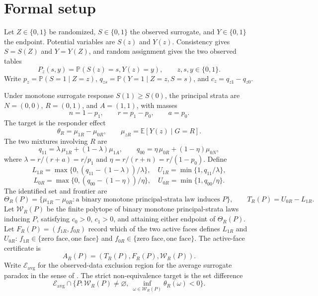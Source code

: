 \documentclass[11pt]{article}
\newcommand{\E}{\mathbb{E}}
\renewcommand{\Pr}{\mathbb{P}}
\theoremstyle{definition}
\theoremstyle{plain}
\theoremstyle{remark}
\begin{document}
\section{Formal setup}
Let \(Z\in\{0,1\}\) be randomized, \(S\in\{0,1\}\) the observed surrogate, and \(Y\in\{0,1\}\) the endpoint. Potential variables are \(S(z)\) and \(Y(z)\). Consistency gives \(S=S(Z)\) and \(Y=Y(Z)\), and random assignment gives the two observed tables
\[
  P_z(s,y)=\Pr(S(z)=s,Y(z)=y),\qquad z,s,y\in\{0,1\}.
\]
Write \(p_z=\Pr(S=1\mid Z=z)\), \(q_{zs}=\Pr(Y=1\mid Z=z,S=s)\), and \(c_z=q_{z1}-q_{z0}\).

Under monotone surrogate response \(S(1)\ge S(0)\), the principal strata are \(N=(0,0)\), \(R=(0,1)\), and \(A=(1,1)\), with masses
\[
  n=1-p_1,\qquad r=p_1-p_0,\qquad a=p_0 .
\]
The target is the responder effect
\[
  \theta_R=\mu_{1R}-\mu_{0R},\qquad
  \mu_{zR}=\E[Y(z)\mid G=R].
\]
The two mixtures involving \(R\) are
\[
  q_{11}=\lambda\,\mu_{1R}+(1-\lambda)\mu_{1A},
  \qquad
  q_{00}=\eta\,\mu_{0R}+(1-\eta)\mu_{0N},
\]
where \(\lambda=r/(r+a)=r/p_1\) and \(\eta=r/(r+n)=r/(1-p_0)\). Define
\[
  L_{1R}=\max\{0,(q_{11}-(1-\lambda))/\lambda\},\quad
  U_{1R}=\min\{1,q_{11}/\lambda\},
\]
\[
  L_{0R}=\max\{0,(q_{00}-(1-\eta))/\eta\},\quad
  U_{0R}=\min\{1,q_{00}/\eta\}.
\]
The identified set and frontier are
\[
  \Theta_R(P)=\{\mu_{1R}-\mu_{0R}: \text{a binary monotone principal-strata law induces }P\},
  \qquad
  T_R(P)=U_{0R}-L_{1R}.
\]
Let \(\mathcal W_R(P)\) be the finite polytope of binary monotone principal-strata laws inducing \(P\), satisfying \(c_0>0\), \(c_1>0\), and attaining either endpoint of \(\Theta_R(P)\). Let \(F_R(P)=(f_{1R},f_{0R})\) record which of the two active faces defines \(L_{1R}\) and \(U_{0R}\): \(f_{1R}\in\{\text{zero face},\text{one face}\}\) and \(f_{0R}\in\{\text{zero face},\text{one face}\}\). The active-face certificate is
\[
  A_R(P)=(T_R(P),F_R(P),\mathcal W_R(P)).
\]
Write \(\mathcal E_{\mathrm{avg}}\) for the observed-data exclusion region for the average surrogate paradox in the sense of \citet[Sec.~3, Theorems~1--2]{YinLiuGengLuo2019}. The strict non-equivalence target is the set difference
\[
  \mathcal E_{\mathrm{avg}}\cap\{P:\mathcal W_R(P)\ne\varnothing,\ \inf_{\omega\in\mathcal W_R(P)}\theta_R(\omega)<0\}.
\]
\end{document}
